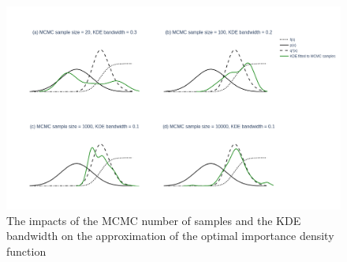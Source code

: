     \begin{figure}[H]
        \centering
        \includegraphics[scale=0.30]{Figures/Images/Illustrative Example/near_opt_IS_dists.png}
        \caption{The impacts of the MCMC number of samples and the KDE bandwidth on the approximation of the optimal importance density function}
        \label{fig:near_opt_IS_dists}
    \end{figure}